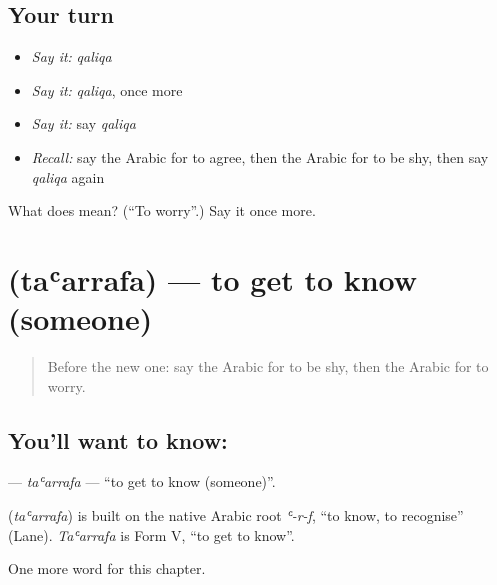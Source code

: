 \subsection*{Your turn}
\begin{itemize}
\raggedright
  \item \emph{Say it:} \emph{qaliqa}
  \item \emph{Say it:} \emph{qaliqa}, once more
  \item \emph{Say it:} say \emph{qaliqa}
  \item \emph{Recall:} say the Arabic for to agree, then the Arabic for to be shy, then say \emph{qaliqa} again
\end{itemize}

\begin{tcolorbox}[breakable,colback=teal!4,colframe=teal!35!black,title={Before you move on}]
What does  mean? (\textquotedblleft{}To worry\textquotedblright{}.) Say it once more.
\end{tcolorbox}
\section[\texorpdfstring{\ar{تعرف} (taʿarrafa)}{تعرف (taʿarrafa)}]{ (taʿarrafa) — to get to know (someone)}

\label{lesson:AR-C227-taarrafa}



\begin{quote}
Before the new one: say the Arabic for to be shy, then the Arabic for to worry.
\end{quote}

\subsection*{You'll want to know: }
\textbf{} — \emph{taʿarrafa} — \textquotedblleft{}to get to know (someone)\textquotedblright{}.

\begin{cousinweb}
\textbf{} (\emph{taʿarrafa}) is built on the native Arabic root \emph{ʿ-r-f}, \textquotedblleft{}to know, to recognise\textquotedblright{} (Lane). \emph{Taʿarrafa} is Form V, \textquotedblleft{}to get to know\textquotedblright{}.
\end{cousinweb}

\begin{grammarlens}[title={What you've built}]
One more word for this chapter.
\end{grammarlens}

